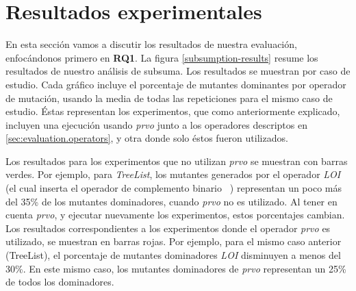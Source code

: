 
\section{Resultados experimentales}
\label{sec:evaluation.results}

En esta secci\'on vamos a discutir los resultados de nuestra evaluaci\'on, enfoc\'andonos primero en \textbf{RQ1}. La figura \ref{subsumption-results} resume los resultados de nuestro an\'alisis de subsuma. Los resultados se muestran por caso de estudio. Cada gr\'afico incluye el porcentaje de mutantes dominantes por operador de mutaci\'on, usando la media de todas las repeticiones para el mismo caso de estudio. \'Estas representan los experimentos, que como anteriormente explicado, incluyen una ejecuci\'on usando \emph{prvo} junto a los operadores descriptos en \ref{sec:evaluation.operators}, y otra donde solo \'estos fueron utilizados.

Los resultados para los experimentos que no utilizan \emph{prvo} se muestran con barras verdes. Por ejemplo, para \emph{TreeList}, los mutantes generados por el operador \emph{LOI} (el cual inserta el operador de complemento binario \emph{~}) representan un poco m\'as del 35\% de los mutantes dominadores, cuando \emph{prvo} no es utilizado. Al tener en cuenta \emph{prvo}, y ejecutar nuevamente los experimentos, estos porcentajes cambian. Los resultados correspondientes a los experimentos donde el operador \emph{prvo} es utilizado, se muestran en barras rojas. Por ejemplo, para el mismo caso anterior (TreeList), el porcentaje de mutantes dominadores \emph{LOI} disminuyen a menos del 30\%. En este mismo caso, los mutantes dominadores de \emph{prvo} representan un 25\% de todos los dominadores.

